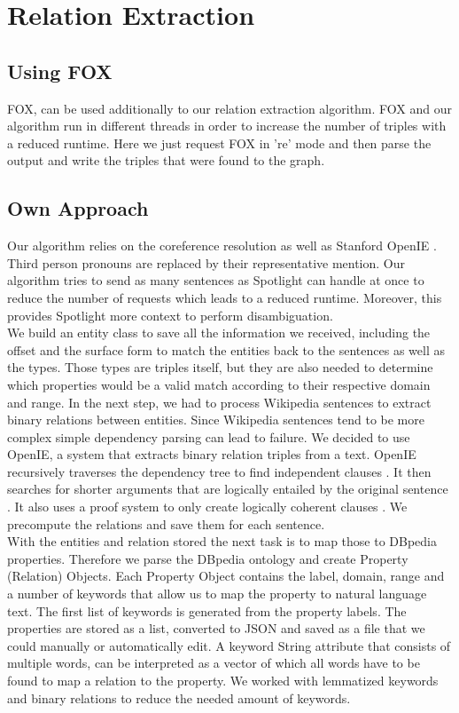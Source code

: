 \documentclass[runningheads]{llncs}
\begin{document}
\section{Relation Extraction}

\subsection{Using FOX}
FOX, can be used additionally to our relation extraction algorithm. FOX and our algorithm run in different threads in order to increase the number of triples with a reduced runtime. Here we just request FOX in 're' mode and then parse the output and write the triples that were found to the graph.
\subsection{Own Approach}
Our algorithm relies on the coreference resolution as well as Stanford OpenIE \cite{openie}.
Third person pronouns are replaced by their representative mention. Our algorithm tries to send as many sentences as Spotlight can handle at once to reduce the number of requests which leads to a reduced runtime. Moreover, this provides Spotlight more context to perform disambiguation. \\

We build an entity class to save all the information we received, including the offset and the surface form to match the entities back to the sentences as well as the types. Those types are triples itself, but they are also needed to determine which properties would be a valid match according to their respective domain and range.
In the next step, we had to process Wikipedia sentences to extract binary relations between entities. Since Wikipedia sentences tend to be more complex simple dependency parsing can lead to failure.
We decided to use OpenIE, a system that extracts binary relation triples from a text. OpenIE recursively traverses the dependency tree to find independent clauses \cite{openie}. It then searches for shorter arguments that are logically entailed by the original sentence \cite{openie}. It also uses a proof system to only create logically coherent clauses \cite{openie}.
We precompute the relations and save them for each sentence. \\

With the entities and relation stored the next task is to map those to DBpedia properties. Therefore we parse the DBpedia ontology and create Property (Relation) Objects. Each Property Object contains the label, domain, range and a number of keywords that allow us to map the property to natural language text. The first list of keywords is generated from the property labels. 
The properties are stored as a list, converted to JSON and saved as a file that we could manually or automatically edit.
A keyword String attribute that consists of multiple words, can be interpreted as a vector of which all words have to be found to map a relation to the property. We worked with lemmatized keywords and binary relations to reduce the needed amount of keywords. \\
\end{document}
